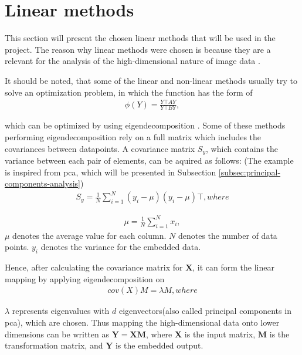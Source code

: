 \section{Linear methods}\label{sec:linear-methods}
This section will present the chosen linear methods that will be used in the project. The reason why linear methods were chosen is because they are a relevant for the analysis of the high-dimensional nature of image data \cite{linear-dimensionality-reduction-insights}.

It should be noted, that some of the linear and non-linear methods usually try to solve an optimization problem, in which the function has the form of 
\begin{align}
  \phi(Y) = \frac{Y \top AY}{Y \top BY},
\end{align}

which can be optimized by using eigendecomposition \cite{dimensionality-reduction-comparative-review}. Some of these methods performing eigendecomposition rely on a full matrix which includes the covariances between datapoints. A covariance matrix $S_y$, which contains the variance between each pair of elements, can be aquired as follows: (The example is inspired from \gls{pca}, which will be presented in Subsection \ref{subsec:principal-components-analysis})
\begin{align}
  S_y = \frac{1}{N}\sum\limits_{i=1}^{N}(y_i - \mu)(y_i - \mu)\top, where 
\end{align}

\begin{align}
  \mu = \frac{1}{N}\sum\limits_{i=1}^{N}x_i,
\end{align}
$\mu$ denotes the average value for each column. $N$ denotes the number of data points. $y_i$ denotes the variance for the embedded data.

Hence, after calculating the covariance matrix for $\mathbf{X}$, it can form the linear mapping by applying eigendecomposition on
\begin{align}
  cov(X)M = \lambda M, where
\end{align}

$\lambda$ represents eigenvalues with $d$ eigenvectors(also called principal components in \gls{pca}), which are chosen. Thus mapping the high-dimensional data onto lower dimensions can be written as $\mathbf{Y=XM}$, where $\mathbf{X}$ is the input matrix, $\mathbf{M}$ is the transformation matrix, and $\mathbf{Y}$ is the embedded output.



